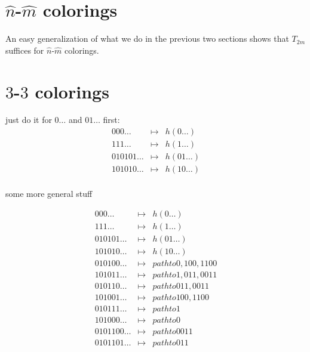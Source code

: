 \documentclass[a4paper]{article}
\begin{document}
\section{$\hat{n}$-$\hat{m}$ colorings}

An easy generalization of what we do in the previous two sections shows
that $T_{2m}$ suffices for $\hat{n}$-$\hat{m}$ colorings.


\section{$3$-$3$ colorings}

just do it for $0\dots$ and $01\dots$ first:
\[
 \begin{array}{lcl}
 000\dots & \mapsto & h(0\dots) \\
 111\dots & \mapsto & h(1\dots) \\
 010101\dots & \mapsto & h(01\dots) \\
 101010\dots & \mapsto & h(10\dots) \\
 \end{array}
\]

some more general stuff

\[
 \begin{array}{lcl}
 000\dots & \mapsto & h(0\dots) \\
 111\dots & \mapsto & h(1\dots) \\
 010101\dots & \mapsto & h(01\dots) \\
 101010\dots & \mapsto & h(10\dots) \\
 010100\dots & \mapsto & path to 0, 100, 1100 \\
 101011\dots & \mapsto & path to 1, 011, 0011 \\
 010110\dots & \mapsto & path to 011, 0011 \\
 101001\dots & \mapsto & path to 100, 1100 \\
 010111\dots & \mapsto & path to 1 \\
 101000\dots & \mapsto & path to 0 \\
 0101100\dots & \mapsto & path to 0011 \\
 0101101\dots & \mapsto & path to 011 \\
 \end{array}
\]
\end{document}
